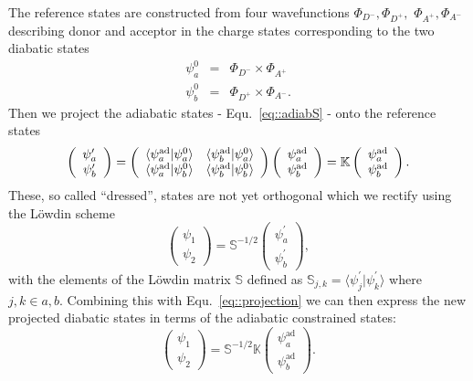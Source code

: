 \documentclass[twoside,10pt,titlepage,a4paper]{article}
\begin{document}
The reference states are constructed from four wavefunctions $\Phi_{D^-},\Phi_{D^+},$ $\Phi_{A^+},\Phi_{A^-}$ describing donor and acceptor in the charge states corresponding to the two diabatic states
\begin{eqnarray}
\psi_a^0 &=& \Phi_{D^-}\times \Phi_{A^+} \nonumber\\
\psi_b^0 &= &\Phi_{D^+}\times \Phi_{A^-}.
\end{eqnarray}
Then we project the adiabatic states - Equ.~\ref{eq::adiabS} - onto the reference states
\begin{equation}
\label{eq::projection}
\left( \begin{array}{c} \psi^\prime_a\\ \psi^\prime_b\end{array}\right)=\left(
\begin{array}{c c}
 \langle \psi^\text{ad}_a \vert \psi^0_a\rangle & \langle \psi^\text{ad}_b \vert \psi^0_a\rangle\\
 \langle \psi^\text{ad}_a \vert \psi^0_b\rangle & \langle \psi^\text{ad}_b \vert \psi^0_b\rangle
\end{array} \right) \left( \begin{array}{c} \psi^\text{ad}_a\\ \psi^\text{ad}_b\end{array}\right) = 
\mathbb{K} \left( \begin{array}{c} \psi^\text{ad}_a\\ \psi^\text{ad}_b\end{array}\right).
\end{equation}
These, so called ``dressed'', states are not yet orthogonal which we rectify using the L\"owdin scheme
\begin{equation}
\left( \begin{array}{c} \psi_1\\ \psi_2\end{array}\right)=\mathbb{S}^{-1/2} \left( \begin{array}{c} \psi^\prime_a\\ \psi^\prime_b\end{array}\right),
\end{equation}
with the elements of the L\"owdin matrix $\mathbb{S}$ defined as $\mathbb{S}_{j,k}=\langle
\psi_j^\prime \vert \psi_k^\prime \rangle$ where $j,k \in {a,b}$. Combining this with
Equ.~\ref{eq::projection} we can then express the new projected diabatic states in terms of the
adiabatic constrained states: \begin{equation}
\left( \begin{array}{c} \psi_1\\ \psi_2\end{array}\right)=\mathbb{S}^{-1/2} \mathbb{K} \left( \begin{array}{c} \psi^\text{ad}_a\\ \psi^\text{ad}_b\end{array}\right).
\end{equation}
\end{document}

